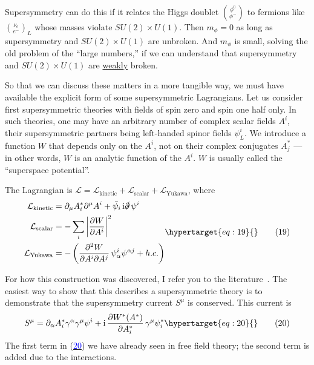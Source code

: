 \documentclass[11pt,a4paper]{article}
\newcommand{\eqtarget}[1]{\hypertarget{eq:#1}{\mathstrut}\tag{#1}}
\newcommand{\eqnref}[1]{(\hyperlink{eq:#1}{\textcolor{blue}{#1}})}
\newcommand{\ii}{\mathrm{i}}
\begin{document}
Supersymmetry can do this if it relates the Higgs doublet $\binom{\phi^0}{\phi^-}$
to fermions like $\binom{\nu_e}{e^-}_L$ whose masses violate $SU(2) \times U(1)$. Then
$m_\phi = 0$ as long as supersymmetry and $SU(2) \times U(1)$ are unbroken. And
$m_\phi$ is small, solving the old problem of the ``large numbers,'' if we
can understand that supersymmetry and $SU(2) \times U(1)$ are \underline{weakly} broken.

So that we can discuss these matters in a more tangible way,
we must have available the explicit form of some supersymmetric Lagrangians.
Let us consider first supersymmetric theories with fields
of spin zero and spin one half only. In such theories, one may have
an arbitrary number of complex scalar fields $A^i$, their supersymmetric
partners being left-handed spinor fields $\psi_L^i$. We introduce a function
$W$ that depends only on the $A^i$, not on their complex conjugates $A^*_j$ ---
in other words, $W$ is an analytic function of the $A^i$. $W$ is usually
called the ``superspace potential''.

The Lagrangian is $\mathcal{L} = \mathcal{L}_{\mathrm{kinetic}} + \mathcal{L}_{\mathrm{scalar}} + \mathcal{L}_{\mathrm{Yukawa}}$, where
\begin{equation}
\begin{aligned}
\mathcal{L}_{\mathrm{kinetic}} &= \partial_\mu A_i^* \partial^\mu A^i + \bar\psi_i\, \ii \slashed{\partial}\, \psi^i \\
\mathcal{L}_{\mathrm{scalar}} &= - \sum_i \left|\frac{\partial W}{\partial A^i}\right|^2 \\
\mathcal{L}_{\mathrm{Yukawa}} &= - \left(\frac{\partial^2 W}{\partial A^i \partial A^j}\, \psi^i_\alpha \psi^{\alpha j} + h.c.\right)
\end{aligned}
\eqtarget{19}
\end{equation}

For how this construction was discovered, I refer you to the literature~\cite{ref2}.
The easiest way to show that this describes a supersymmetric
theory is to demonstrate that the supersymmetry current $S^\mu$ is conserved.
This current is
\begin{equation}
S^\mu = \partial_\alpha A_i^* \gamma^\alpha \gamma^\mu \psi^i + \ii\, \frac{\partial W^*(A^*)}{\partial A_i^*}\, \gamma^\mu \psi_i^*
\eqtarget{20}
\end{equation}
The first term in \eqnref{20} we have already seen in free field theory;
the second term is added due to the interactions.
\end{document}
